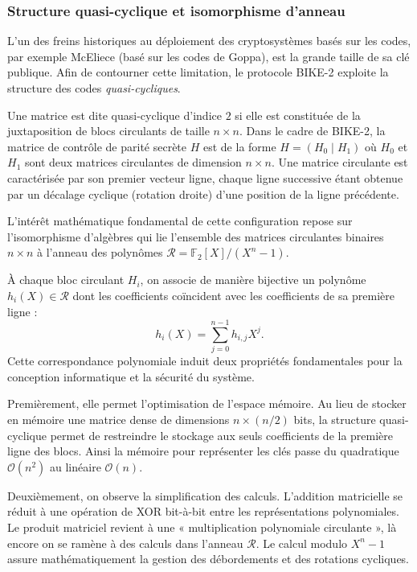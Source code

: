 \documentclass[11pt,a4paper]{article}
\begin{document}
\subsubsection{Structure quasi-cyclique et isomorphisme d'anneau}

L'un des freins historiques au déploiement des cryptosystèmes basés sur les
codes, par exemple McEliece (basé sur les codes de Goppa), est la grande taille
de sa clé publique.
Afin de contourner cette limitation, le protocole BIKE-2 exploite la structure
des codes \emph{quasi-cycliques}.

Une matrice est dite quasi-cyclique d'indice $2$ si elle est constituée de la
juxtaposition de blocs circulants de taille $n \times n$. Dans le cadre de
BIKE-2, la matrice de contrôle de parité secrète $H$ est de la forme $H = (H_0 \mid H_1)$
où $H_0$ et $H_1$ sont deux matrices circulantes de dimension $n \times n$.
Une matrice circulante est caractérisée par son premier vecteur ligne, chaque
ligne successive étant obtenue par un décalage cyclique (rotation droite) d'une
position de la ligne précédente.

L'intérêt mathématique fondamental de cette configuration repose sur
l'isomorphisme d'algèbres qui lie l'ensemble des matrices circulantes binaires
$n \times n$ à l'anneau des polynômes $\mathcal{R} = \mathbb{F}_2[X] / (X^n - 1)$.

À chaque bloc circulant $H_i$, on associe de manière bijective un polynôme
$h_i(X) \in \mathcal{R}$ dont les coefficients coïncident avec les coefficients
de sa première ligne :
\begin{equation}
  h_i(X) = \sum_{j=0}^{n-1} h_{i,j} X^j.
\end{equation}
Cette correspondance polynomiale induit deux propriétés fondamentales pour la
conception informatique et la sécurité du système.

Premièrement, elle permet l'optimisation de l'espace mémoire. Au lieu de stocker
en mémoire une matrice dense de dimensions $n \times (n/2)$ bits, la structure
quasi-cyclique permet de restreindre le stockage aux seuls coefficients de la
première ligne des blocs.
Ainsi la mémoire pour représenter les clés passe du quadratique
$\mathcal{O}(n^2)$ au linéaire $\mathcal{O}(n)$.

Deuxièmement, on observe la simplification des calculs.
L'addition matricielle se réduit à une opération de XOR bit-à-bit entre les
représentations polynomiales.
Le produit matriciel revient à une « multiplication polynomiale
circulante », là encore on se ramène à des calculs dans l'anneau $\mathcal{R}$.
Le calcul modulo $X^n - 1$ assure mathématiquement la gestion des débordements
et des rotations cycliques.
\end{document}
